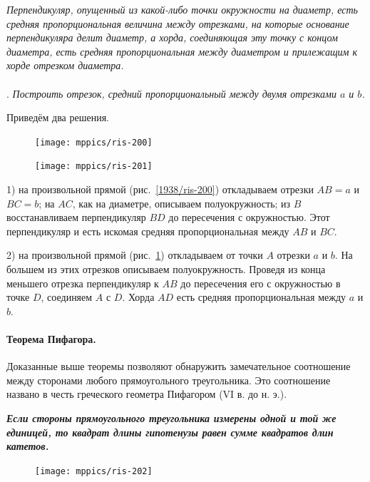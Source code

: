 \documentclass[oneside]{book}
\begin{document}
\emph{Перпендикуляр, опущенный из какой-либо точки окружности на диаметр, есть средняя пропорциональная величина между отрезками, на которые основание перпендикуляра делит диаметр, а хорда, соединяющая эту точку с концом диаметра, есть средняя пропорциональная между диаметром и прилежащим к хорде отрезком диаметра.}

\paragraph{}\label{1938/190}
.
\emph{Построить отрезок, средний пропорциональный между двумя отрезками $a$ и $b$.}

Приведём два решения.

\begin{figure}
\centering
\texttt{[image: mppics/ris-200]}
\caption{}\label{1938/ris-200}
\bigskip
\texttt{[image: mppics/ris-201]}
\caption{}\label{1938/ris-201}
\end{figure}

1) на произвольной прямой (рис.~\ref{1938/ris-200}) откладываем отрезки $AB=a$ и $BC=b$;
на $AC$, как на диаметре, описываем полуокружность;
из $B$ восстанавливаем перпендикуляр $BD$ до пересечения с окружностью.
Этот перпендикуляр и есть искомая средняя пропорциональная между $AB$ и $BC$.

2) на произвольной прямой (рис.~\ref{1938/ris-201}) откладываем от точки $A$ отрезки $a$ и $b$.
На большем из этих отрезков описываем полуокружность.
Проведя из конца меньшего отрезка перпендикуляр к $AB$ до пересечения его с окружностью в точке $D$, соединяем $A$ с $D$.
Хорда $AD$ есть средняя пропорциональная между $a$ и $b$.

\paragraph{Теорема Пифагора.}\label{1938/191}
Доказанные выше теоремы позволяют обнаружить замечательное соотношение между сторонами любого прямоугольного треугольника.
Это соотношение названо в честь греческого геометра Пифагором (VI в.
до н. э.).

\textbf{\emph{Если стороны прямоугольного треугольника измерены одной и той же единицей, то квадрат длины гипотенузы равен сумме квадратов длин катетов.}}

\begin{figure}
\centering
\texttt{[image: mppics/ris-202]}
\caption{}\label{1938/ris-202}
\end{figure}
\end{document}
